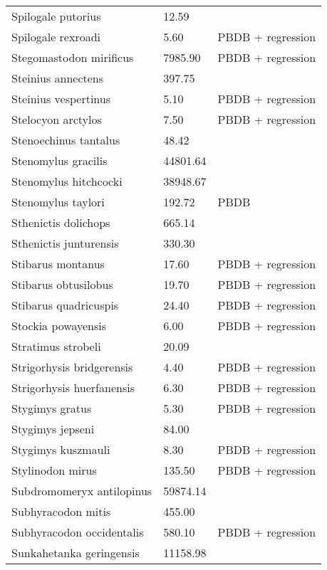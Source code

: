 \documentclass{article}
\begin{document}
\begin{center}
\begin{longtable}{p{} p{} p{}}
    Spilogale putorius & 12.59 & \cite{Smith2004} \\ 
    Spilogale rexroadi & 5.60 & PBDB + regression \\ 
    Stegomastodon mirificus & 7985.90 & PBDB + regression \\ 
    Steinius annectens & 397.75 & \cite{Strait2001} \\ 
    Steinius vespertinus & 5.10 & PBDB + regression \\ 
    Stelocyon arctylos & 7.50 & PBDB + regression \\ 
    Stenoechinus tantalus & 48.42 & \cite{Tomiya2013} \\ 
    Stenomylus gracilis & 44801.64 & \cite{Tomiya2013} \\ 
    Stenomylus hitchcocki & 38948.67 & \cite{Tomiya2013} \\ 
    Stenomylus taylori & 192.72 & PBDB \\ 
    Sthenictis dolichops & 665.14 & \cite{Tomiya2013} \\ 
    Sthenictis junturensis & 330.30 & \cite{Tomiya2013} \\ 
    Stibarus montanus & 17.60 & PBDB + regression \\ 
    Stibarus obtusilobus & 19.70 & PBDB + regression \\ 
    Stibarus quadricuspis & 24.40 & PBDB + regression \\ 
    Stockia powayensis & 6.00 & PBDB + regression \\ 
    Stratimus strobeli & 20.09 & \cite{Tomiya2013} \\ 
    Strigorhysis bridgerensis & 4.40 & PBDB + regression \\ 
    Strigorhysis huerfanensis & 6.30 & PBDB + regression \\ 
    Stygimys gratus & 5.30 & PBDB + regression \\ 
    Stygimys jepseni & 84.00 & \cite{Wilson2012} \\ 
    Stygimys kuszmauli & 8.30 & PBDB + regression \\ 
    Stylinodon mirus & 135.50 & PBDB + regression \\ 
    Subdromomeryx antilopinus & 59874.14 & \cite{Tomiya2013} \\ 
    Subhyracodon mitis & 455.00 & \cite{Scott1940} \\ 
    Subhyracodon occidentalis & 580.10 & PBDB + regression \\ 
    Sunkahetanka geringensis & 11158.98 & \cite{Tomiya2013} \\ 

\end{longtable}
\end{center}
\end{document}
